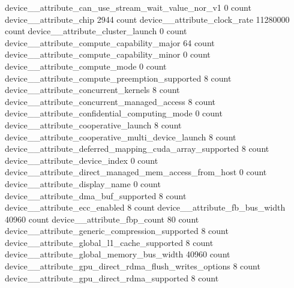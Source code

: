 device__attribute_can_use_stream_wait_value_nor_v1                                             0 count
device__attribute_chip                                                                      2944 count
device__attribute_clock_rate                                                            11280000 count
device__attribute_cluster_launch                                                               0 count
device__attribute_compute_capability_major                                                    64 count
device__attribute_compute_capability_minor                                                     0 count
device__attribute_compute_mode                                                                 0 count
device__attribute_compute_preemption_supported                                                 8 count
device__attribute_concurrent_kernels                                                           8 count
device__attribute_concurrent_managed_access                                                    8 count
device__attribute_confidential_computing_mode                                                  0 count
device__attribute_cooperative_launch                                                           8 count
device__attribute_cooperative_multi_device_launch                                              8 count
device__attribute_deferred_mapping_cuda_array_supported                                        8 count
device__attribute_device_index                                                                 0 count
device__attribute_direct_managed_mem_access_from_host                                          0 count
device__attribute_display_name                                                                 0 count
device__attribute_dma_buf_supported                                                            8 count
device__attribute_ecc_enabled                                                                  8 count
device__attribute_fb_bus_width                                                             40960 count
device__attribute_fbp_count                                                                   80 count
device__attribute_generic_compression_supported                                                8 count
device__attribute_global_l1_cache_supported                                                    8 count
device__attribute_global_memory_bus_width                                                  40960 count
device__attribute_gpu_direct_rdma_flush_writes_options                                         8 count
device__attribute_gpu_direct_rdma_supported                                                    8 count
